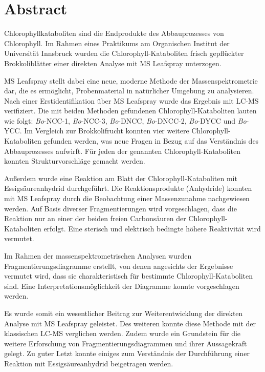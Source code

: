 

\chapter*{Abstract}
\label{cha:abstract}

Chlorophyllkataboliten sind die Endprodukte des Abbauprozesses von Chlorophyll. Im Rahmen eines Praktikums am Organischen Institut der Universität Innsbruck wurden die Chlorophyll-Kataboliten frisch gepflückter Brokkoliblätter einer direkten Analyse mit MS Leafspray unterzogen. 

MS Leafspray stellt dabei eine neue, moderne Methode der Massenspektrometrie dar, die es ermöglicht, Probenmaterial in natürlicher Umgebung zu analysieren. Nach einer Erstidentifikation über MS Leafspray wurde das Ergebnis mit LC-MS verifiziert. Die mit beiden Methoden gefundenen Chlorophyll-Kataboliten lauten wie folgt: \textit{Bo}-NCC-1, \textit{Bo}-NCC-3, \textit{Bo}-DNCC, \textit{Bo}-DNCC-2, \textit{Bo}-DYCC und \textit{Bo}-YCC. Im Vergleich zur Brokkolifrucht konnten vier weitere Chlorophyll-Kataboliten gefunden werden, was neue Fragen in Bezug auf das Verständnis des Abbauprozesses aufwirft. Für jeden der genannten Chlorophyll-Kataboliten konnten Strukturvorschläge gemacht werden.

Außerdem wurde eine Reaktion am Blatt der Chlorophyll-Kataboliten mit Essigsäureanhydrid durchgeführt. Die Reaktionsprodukte (Anhydride) konnten mit MS Leafspray durch die Beobachtung einer Massenzunahme nachgewiesen werden. Auf Basis diverser Fragmentierungen wird vorgeschlagen, dass die Reaktion nur an einer der beiden freien Carbonsäuren der Chlorophyll-Kataboliten erfolgt. Eine sterisch und elektrisch bedingte höhere Reaktivität wird vermutet. 

Im Rahmen der massenspektrometrischen Analysen wurden Fragmentierungsdiagramme erstellt, von denen angesichts der Ergebnisse vermutet wird, dass sie charakteristisch für bestimmte Chlorophyll-Kataboliten sind. Eine Interpretationsmöglichkeit der Diagramme konnte vorgeschlagen werden. 

Es wurde somit ein wesentlicher Beitrag zur Weiterentwicklung der direkten Analyse mit MS Leafspray geleistet. Des weiteren konnte diese Methode mit der klassischen LC-MS verglichen werden. Zudem wurde ein Grundstein für die weitere Erforschung von Fragmentierungsdiagrammen und ihrer Aussagekraft gelegt. Zu guter Letzt konnte einiges zum Verständnis der Durchführung einer Reaktion mit Essigsäureanhydrid beigetragen werden.



